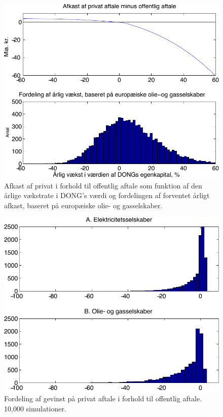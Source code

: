 \documentclass{article}
\begin{document}
\begin{figure}
\centerline{\includegraphics[scale=0.8]{../matlab/figs/afkast_hist_combine_oilgas_guan}}
\caption{Afkast af privat i forhold til offentlig aftale som funktion af den \aa{}rlige v\ae{}kstrate i DONG's v\ae{}rdi og fordelingen af forventet \aa{}rligt afkast, baseret p\aa{} europ\ae{}iske olie- og gasselskaber.}
\label{fig:combine2}
\end{figure}


\begin{figure}
\centerline{\includegraphics[scale=0.8]{../matlab/figs/sim_return_guan}}
\caption{Fordeling af gevinst på privat aftale i forhold til offentlig aftale. 10,000 simulationer. }
\label{fig:sim}
\end{figure}
\end{document}
